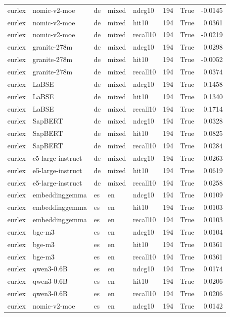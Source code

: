 \begin{tabular}{lllllrrr}
eurlex & nomic-v2-moe & de & mixed & ndcg10 & 194 & True & -0.0145 \\
eurlex & nomic-v2-moe & de & mixed & hit10 & 194 & True & 0.0361 \\
eurlex & nomic-v2-moe & de & mixed & recall10 & 194 & True & -0.0219 \\
eurlex & granite-278m & de & mixed & ndcg10 & 194 & True & 0.0298 \\
eurlex & granite-278m & de & mixed & hit10 & 194 & True & -0.0052 \\
eurlex & granite-278m & de & mixed & recall10 & 194 & True & 0.0374 \\
eurlex & LaBSE & de & mixed & ndcg10 & 194 & True & 0.1458 \\
eurlex & LaBSE & de & mixed & hit10 & 194 & True & 0.1340 \\
eurlex & LaBSE & de & mixed & recall10 & 194 & True & 0.1714 \\
eurlex & SapBERT & de & mixed & ndcg10 & 194 & True & 0.0328 \\
eurlex & SapBERT & de & mixed & hit10 & 194 & True & 0.0825 \\
eurlex & SapBERT & de & mixed & recall10 & 194 & True & 0.0284 \\
eurlex & e5-large-instruct & de & mixed & ndcg10 & 194 & True & 0.0263 \\
eurlex & e5-large-instruct & de & mixed & hit10 & 194 & True & 0.0619 \\
eurlex & e5-large-instruct & de & mixed & recall10 & 194 & True & 0.0258 \\
eurlex & embeddinggemma & es & en & ndcg10 & 194 & True & 0.0109 \\
eurlex & embeddinggemma & es & en & hit10 & 194 & True & 0.0103 \\
eurlex & embeddinggemma & es & en & recall10 & 194 & True & 0.0103 \\
eurlex & bge-m3 & es & en & ndcg10 & 194 & True & 0.0104 \\
eurlex & bge-m3 & es & en & hit10 & 194 & True & 0.0361 \\
eurlex & bge-m3 & es & en & recall10 & 194 & True & 0.0361 \\
eurlex & qwen3-0.6B & es & en & ndcg10 & 194 & True & 0.0174 \\
eurlex & qwen3-0.6B & es & en & hit10 & 194 & True & 0.0206 \\
eurlex & qwen3-0.6B & es & en & recall10 & 194 & True & 0.0206 \\
eurlex & nomic-v2-moe & es & en & ndcg10 & 194 & True & 0.0142 \\

\end{tabular}
